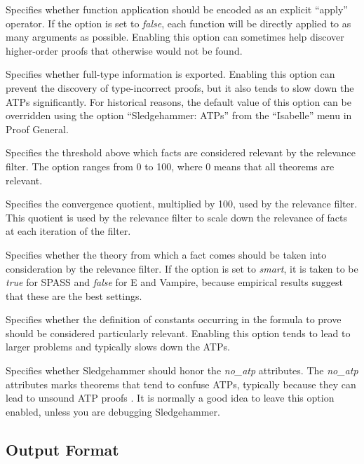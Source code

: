 \documentclass[a4paper,12pt]{article}
\begin{document}
\begin{enum}
Specifies whether function application should be encoded as an explicit
``apply'' operator. If the option is set to \textit{false}, each function will
be directly applied to as many arguments as possible. Enabling this option can
sometimes help discover higher-order proofs that otherwise would not be found.

Specifies whether full-type information is exported. Enabling this option can
prevent the discovery of type-incorrect proofs, but it also tends to slow down
the ATPs significantly. For historical reasons, the default value of this option
can be overridden using the option ``Sledgehammer: ATPs'' from the ``Isabelle''
menu in Proof General.

Specifies the threshold above which facts are considered relevant by the
relevance filter. The option ranges from 0 to 100, where 0 means that all
theorems are relevant.

Specifies the convergence quotient, multiplied by 100, used by the relevance
filter. This quotient is used by the relevance filter to scale down the
relevance of facts at each iteration of the filter.

Specifies whether the theory from which a fact comes should be taken into
consideration by the relevance filter. If the option is set to \textit{smart},
it is taken to be \textit{true} for SPASS and \textit{false} for E and Vampire,
because empirical results suggest that these are the best settings.

Specifies whether the definition of constants occurring in the formula to prove
should be considered particularly relevant. Enabling this option tends to lead
to larger problems and typically slows down the ATPs.

Specifies whether Sledgehammer should honor the \textit{no\_atp} attributes. The
\textit{no\_atp} attributes marks theorems that tend to confuse ATPs, typically
because they can lead to unsound ATP proofs \cite{boehme-nipkow-2010}. It is
normally a good idea to leave this option enabled, unless you are debugging
Sledgehammer.

\end{enum}

\subsection{Output Format}
\label{output-format}
\end{document}
